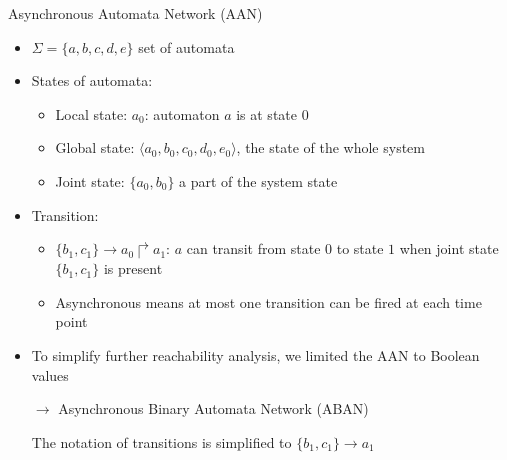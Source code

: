 \documentclass[8pt]{beamer}
\begin{document}
\begin{frame}{Asynchronous Automata Network (AAN)~\cite{folschette2015}}
	
	
	\begin{itemize}
\item<+-> $\Sigma=\{a,b,c,d,e\}$ set of automata 
\item<+-> States of automata: 
\begin{itemize}
    \item<+-> Local state: $a_0$: automaton $a$ is at state $0$
    \item<+-> Global state: $\langle a_0,b_0,c_0,d_0,e_0 \rangle$, the state of the whole system
    \item<+-> Joint state: $\{a_0,b_0\}$ a part of the system state 
\end{itemize}
 
\item<+-> Transition:
\begin{itemize}
    \item<+-> $\{b_1,c_1\}\to a_0\Rsh a_1$: $a$ can transit from state $0$ to state $1$ when joint state $\{b_1,c_1\}$ is present
    \item<+-> Asynchronous means at most one transition can be fired at each time point
\end{itemize}


\item<+-> To simplify further reachability analysis, we limited the AAN to Boolean values
	
	$\to$ Asynchronous Binary Automata Network (ABAN)
    
    The notation of transitions is simplified to $\{b_1,c_1\}\to a_1$
\end{itemize}
	
\end{frame}
\end{document}
